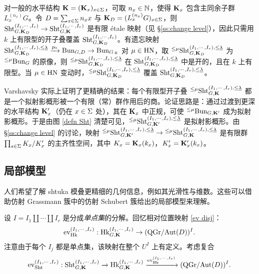 对一般的水平结构 $\mathbf{K}=(\mathbf{K}_{x})_{x\in \Sigma}$，可取 $n_{x}\in\mathbb{N}$，使得 $\mathbf{K}_{x}$ 包含主同余子群 $L^{(n_{x})}_{x}G$。令 $D=\sum_{x\in \Sigma}n_{x}x$ 与 $\mathbf{K}_{D}=(L^{(n_{x})}_{x}G)_{x\in \Sigma}$，则 $\textup{Sht}^{(I_{1},\cdots, I_{r})}_{G,\mathbf{K}_{D}}\to \textup{Sht}^{(I_{1},\cdots, I_{r})}_{G,\mathbf{K}}$ 是有限 étale 映射（见 \S\ref{ss:change level}），因此只需用 $k$ 上有限型的开子叠覆盖 $\textup{Sht}^{(I_{1},\cdots, I_{r})}_{G,\mathbf{K}_{D}}$。有遗忘映射 $\textup{Sht}^{(I_{1},\cdots, I_{r}),\le\underline{\lambda}}_{G,\mathbf{K}_{D}}\xrightarrow{p_{0}}\textup{Bun}_{G,D}\to \textup{Bun}_{G}$。对 $\mu\in \mathrm{HN}$，取 ${}^{\le \mu}\textup{Sht}^{(I_{1},\cdots, I_{r}),\le\underline{\lambda}}_{G,\mathbf{K}_{D}}$ 为 ${}^{\le\mu}\textup{Bun}_{G}$ 的原像，则 ${}^{\le \mu}\textup{Sht}^{(I_{1},\cdots, I_{r}),\le\underline{\lambda}}_{G,\mathbf{K}_{D}}$ 在 $\textup{Sht}^{(I_{1},\cdots, I_{r}),\le\underline{\lambda}}_{G,\mathbf{K}_{D}}$ 中是开的，且在 $k$ 上有限型。当 $\mu\in \mathrm{HN}$ 变动时，${}^{\le \mu}\textup{Sht}^{(I_{1},\cdots, I_{r}),\le\underline{\lambda}}_{G,\mathbf{K}_{D}}$ 覆盖 $\textup{Sht}^{(I_{1},\cdots, I_{r}),\le\underline{\lambda}}_{G,\mathbf{K}_{D}}$。

\medskip\noindent Varshavsky \cite[Prop.2.16(1)]{Var} 实际上证明了更精确的结果：每个有限型开子叠 ${}^{\le\mu}\textup{Sht}^{(I_{1},\cdots, I_{r}), \le\underline{\lambda}}_{G,\mathbf{K}}$ 都是一个拟射影概形被一个有限（常）群作用后的商。论证思路是：通过过渡到更深的水平结构 $\mathbf{K}'_{x}$（仍在 $x\in \Sigma$ 处），其在 $\mathbf{K}_{x}$ 中正规，可使 ${}^{\le\mu}\textup{Bun}_{G,\mathbf{K}'}$ 成为拟射影概形。于是由图 \eqref{defn Sht} 清楚可见，${}^{\le\mu}\textup{Sht}^{(I_{1},\cdots, I_{r}), \le\underline{\lambda}}_{G,\mathbf{K}'}$ 是拟射影概形。由 \S\ref{ss:change level} 的讨论，映射 ${}^{\le\mu}\textup{Sht}^{(I_{1},\cdots, I_{r}), \le\underline{\lambda}}_{G,\mathbf{K}'}\to {}^{\le\mu}\textup{Sht}^{(I_{1},\cdots, I_{r}), \le\underline{\lambda}}_{G,\mathbf{K}}$ 是有限群 $\prod_{s\in \Sigma}K_{x}/K'_{x}$ 的主齐性空间，其中 $K_{x}=\mathbf{K}_{x}(k_{x})$，$K'_{x}=\mathbf{K}'_{x}(k_{x})$。

\subsection{局部模型}
人们希望了解 shtuka 模叠更精细的几何信息，例如其光滑性与维数。这些可以借助仿射 Grassmann 簇中的仿射 Schubert 簇给出的局部模型来理解。

设 $I=I_{1}\coprod\cdots\coprod I_{r}$ 是分成\emph{单点集}的分解。回忆相对位置映射 \eqref{ev disj}：
\begin{equation}\label{ev Hk singleton}
\textup{ev}^{(I_{1},\cdots, I_{r})}_{\textup{Hk}}: \textup{Hk}^{(I_{1},\cdots, I_{r})}_{G,\mathbf{K}}\to (\mathrm{QGr}/\textup{Aut}(D))^{I}.
\end{equation}
注意由于每个 $I_{j}$ 都是单点集，该映射在整个 $U^{I}$ 上有定义。考虑复合
\begin{equation}\label{ev Sht singleton}
\textup{ev}^{(I_{1},\cdots, I_{r})}_{\textup{Sht}}: \textup{Sht}^{(I_{1},\cdots, I_{r})}_{G,\mathbf{K}}\xrightarrow{} \textup{Hk}^{(I_{1},\cdots, I_{r})}_{G,\mathbf{K}}\xrightarrow{\textup{ev}^{(I_{1},\cdots, I_{r})}_{\textup{Hk}}} (\mathrm{QGr}/\textup{Aut}(D))^{I}.
\end{equation}

